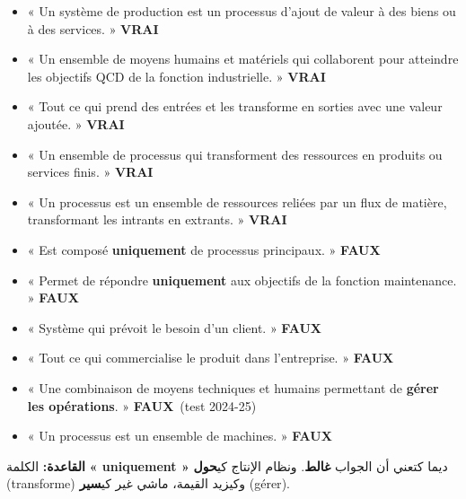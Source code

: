 \documentclass[11pt,a4paper]{article}
\newcommand{\fr}[1]{\textfrench{#1}}
\newcommand{\vrai}{\textcolor{vert}{\textbf{VRAI}}}
\newcommand{\faux}{\textcolor{rouge}{\textbf{FAUX}}}
\begin{document}
\begin{examen}
\begin{itemize}
\item « Un système de production est un processus d'ajout de valeur à des biens ou à des services. » \vrai
\item « Un ensemble de moyens humains et matériels qui collaborent pour atteindre les objectifs QCD de la fonction industrielle. » \vrai
\item « Tout ce qui prend des entrées et les transforme en sorties avec une valeur ajoutée. » \vrai
\item « Un ensemble de processus qui transforment des ressources en produits ou services finis. » \vrai
\item « Un processus est un ensemble de ressources reliées par un flux de matière, transformant les intrants en extrants. » \vrai
\end{itemize}
\end{examen}

\begin{piege}
\begin{itemize}
\item « Est composé \textbf{uniquement} de processus principaux. » \faux
\item « Permet de répondre \textbf{uniquement} aux objectifs de la fonction maintenance. » \faux
\item « Système qui prévoit le besoin d'un client. » \faux
\item « Tout ce qui commercialise le produit dans l'entreprise. » \faux
\item « Une combinaison de moyens techniques et humains permettant de \textbf{gérer les opérations}. » \faux \ (test 2024-25)
\item « Un processus est un ensemble de machines. » \faux
\end{itemize}
\end{piege}

\begin{note}
\par\begin{Arabic}
\textbf{القاعدة:} الكلمة \textbf{« \fr{uniquement} »} ديما كتعني أن الجواب \textbf{غالط}.
ونظام الإنتاج كي\textbf{حول} (\fr{transforme}) وكيزيد القيمة، ماشي غير كي\textbf{سير} (\fr{gérer}).
\end{Arabic}
\end{note}
\end{document}
